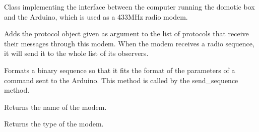 \documentclass[letterpaper,10pt,english]{sphinxmanual}
\begin{document}
\begin{fulllineitems}
\label{implementation_examples:drivers.arduino_radio.ArduinoRadio}
Class implementing the interface between the computer
running the domotic box and the Arduino, which is used as 
a 433MHz radio modem.

\begin{fulllineitems}
\label{implementation_examples:drivers.arduino_radio.ArduinoRadio.attach}
Adds the protocol object given as argument
to the list of protocols that receive their messages
through this modem. 
When the modem receives a radio sequence, it will 
send it to the whole list of its observers.

\end{fulllineitems}


\begin{fulllineitems}
\label{implementation_examples:drivers.arduino_radio.ArduinoRadio.format_arg}
Formats a binary sequence so that it fits the format 
of the parameters of a command sent to the Arduino. This
method is called by the send\_sequence method.

\end{fulllineitems}


\begin{fulllineitems}
\label{implementation_examples:drivers.arduino_radio.ArduinoRadio.get_modem_name}
Returns the name of the modem.

\end{fulllineitems}


\begin{fulllineitems}
\label{implementation_examples:drivers.arduino_radio.ArduinoRadio.get_modem_type}
Returns the type of the modem.

\end{fulllineitems}


\end{fulllineitems}
\end{document}
